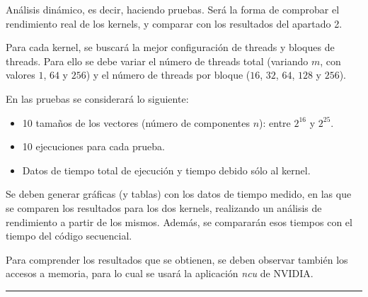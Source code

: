 \documentclass[12pt]{article}
\newenvironment{exercise}[2][Ejercicio]{\begin{trivlist}
\item[\hskip \labelsep {\bfseries #1}\hskip \labelsep {\bfseries #2.}]}{\end{trivlist}}
\begin{document}
\begin{exercise}{3}
    Análisis dinámico, es decir, haciendo pruebas. Será la forma de comprobar el rendimiento real de
    los kernels, y comparar con los resultados del apartado 2.

    Para cada kernel, se buscará la mejor configuración de threads y bloques de threads. Para ello
    se debe variar el número de threads total (variando $m$, con valores $1$, $64$ y $256$) y el
    número de threads por bloque ($16$, $32$, $64$, $128$ y $256$).

    En las pruebas se considerará lo siguiente:
    \begin{itemize}
        \item 10 tamaños de los vectores (número de componentes $n$): entre $2^{16}$ y $2^{25}$.
        \item 10 ejecuciones para cada prueba.
        \item Datos de tiempo total de ejecución y tiempo debido sólo al kernel.
    \end{itemize}

    Se deben generar gráficas (y tablas) con los datos de tiempo medido, en las que se comparen los
    resultados para los dos kernels, realizando un análisis de rendimiento a partir de los mismos.
    Además, se compararán esos tiempos con el tiempo del código secuencial.

    Para comprender los resultados que se obtienen, se deben observar también los accesos a memoria,
    para lo cual se usará la aplicación \textit{ncu} de NVIDIA.

    \begin{center}
        \noindent\rule{4cm}{0.2pt}
    \end{center}


\end{exercise}
\end{document}
